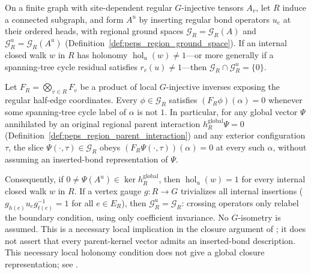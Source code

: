 \begin{theorem}%
    \label{thm:peps_regular_region_parent_flatness}
    \leanok
    On a finite graph with site-dependent regular $G$-injective tensors $A_v$,
    let $R$ induce a connected subgraph, and form $A^u$ by inserting regular
    bond operators $u_e$ at their ordered heads, with regional ground spaces
    $\mathcal G_R=\mathcal G_R(A)$ and $\mathcal G_R^u=\mathcal G_R(A^u)$
    (Definition~\ref{def:peps_region_ground_space}). If an internal closed
    walk $w$ in $R$ has holonomy $\operatorname{hol}_u(w)\ne 1$---or more
    generally if a spanning-tree cycle residual satisfies $r_c(u)\ne 1$---then
    $\mathcal G_R\cap\mathcal G_R^u=\{0\}$.

    Let $F_R=\bigotimes_{v\in R}F_v$ be a product of local $G$-injective
    inverses exposing the regular half-edge coordinates. Every
    $\phi\in\mathcal G_R$ satisfies $(F_R\phi)(\alpha)=0$ whenever some
    spanning-tree cycle label of $\alpha$ is not $1$. In particular, for any
    global vector $\Psi$ annihilated by an original regional parent interaction
    $h_R^{\mathrm{global}}\Psi=0$ (Definition~\ref{def:peps_region_parent_interaction})
    and any exterior configuration $\tau$, the slice $\Psi(\cdot,\tau)\in\mathcal G_R$
    obeys $(F_R\Psi(\cdot,\tau))(\alpha)=0$ at every such $\alpha$, without
    assuming an inserted-bond representation of $\Psi$.

    Consequently, if $0\ne\Psi(A^u)\in\ker h_R^{\mathrm{global}}$, then
    $\operatorname{hol}_u(w)=1$ for every internal closed walk $w$ in $R$.
    If a vertex gauge $g:R\to G$ trivializes all internal insertions
    ($g_{h(e)}u_eg_{t(e)}^{-1}=1$ for all $e\in E_R$), then
    $\mathcal G_R^u=\mathcal G_R$: crossing operators only relabel the boundary
    condition, using only coefficient invariance.
    No $G$-isometry is assumed. This is a necessary local implication
    in the closure argument of \cite[Theorem~5.5]{Schuch2010PEPS};
    it does not assert that every parent-kernel vector admits an
    inserted-bond description.
    This necessary local holonomy condition does not give a global closure representation; see
    \cite{gap:rmp_peps_quantum_double_g_isometry}.
\end{theorem}

